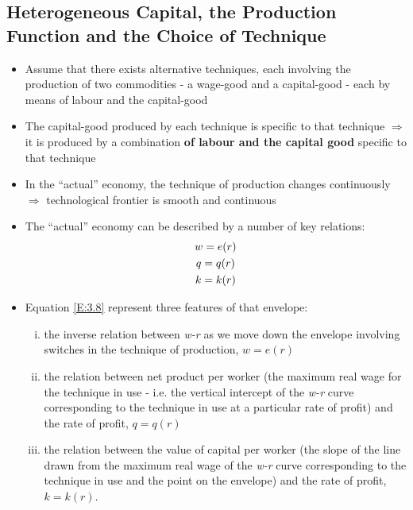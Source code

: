 \documentclass{article}
\begin{document}
\subsection{Heterogeneous Capital, the Production Function and the Choice of Technique}
	\begin{itemize}
		\item  Assume that there exists alternative techniques, each involving the production of two commodities - a wage-good and a capital-good - each by means of labour and the capital-good 
		\item The capital-good produced by each technique is specific to that technique \(\Rightarrow\) it is produced by a combination \textbf{\textcolor{myred}{of labour and the capital good}} specific to that technique
		\item In the ``actual'' economy, the technique of production changes continuously \(\Rightarrow\) technological frontier is smooth and continuous
		\item The ``actual'' economy can be described by a number of key relations:
		\begin{gather}
			w = e(r) \notag\\
			q = q(r) \label{E:3.8}\\
			k = k(r) \notag 
		\end{gather}
		\item Equation \ref{E:3.8} represent three features of that envelope:
		\begin{enumerate}[(i)]
			\item the inverse relation between \textit{w-r} as we move down the envelope involving switches in the technique of production, \( w = e(r) \)
			\item the relation between net product per worker (the maximum real wage for the technique in use - i.e. the vertical intercept of the \textit{w-r} curve corresponding to the technique in use at a particular rate of profit) and the rate of profit, \( q = q(r) \)
			\item the relation between the value of capital per worker (the slope of the line drawn from the maximum real wage of the \textit{w-r} curve corresponding to the technique in use and the point on the envelope) and the rate of profit, \( k = k(r) \).
		\end{enumerate}
	\end{itemize}
\end{document}
